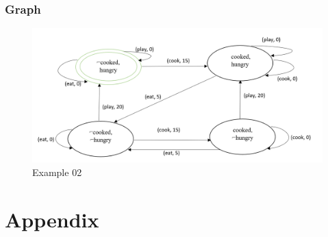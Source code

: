 \documentclass[11pt]{article}
\begin{document}
	\subsubsection{Graph}\label{par:p403}
	\begin{figure}[H]
		\includegraphics[width=1\linewidth, height=0.3\textheight]{./media/figure01.png}
		\caption{Example 02}
		\label{Figure:f03}
	\end{figure}
\newpage
\section{Appendix}	
\begin{appendix}
\listoffigures
\listoftables
\end{appendix}
\end{document}
